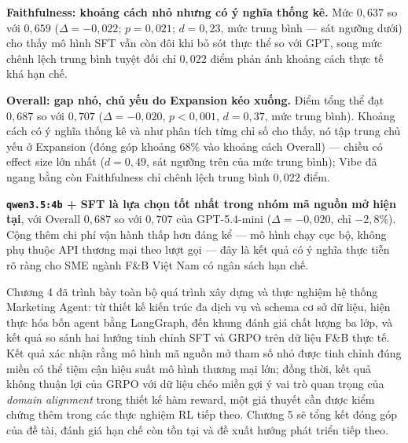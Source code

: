 \textbf{Faithfulness: khoảng cách nhỏ nhưng có ý nghĩa thống kê.}
Mức $0{,}637$ so với $0{,}659$ ($\Delta = -0{,}022$; $p = 0{,}021$;
$d = 0{,}23$, mức trung bình --- sát ngưỡng dưới) cho thấy mô hình
SFT vẫn còn đôi khi bỏ sót thực thể so với GPT, song mức chênh lệch
trung bình tuyệt đối chỉ $0{,}022$ điểm phản ánh khoảng cách thực tế
khá hạn chế.

\textbf{Overall: gap nhỏ, chủ yếu do Expansion kéo xuống.}
Điểm tổng thể đạt $0{,}687$ so với $0{,}707$ ($\Delta = -0{,}020$,
$p < 0{,}001$, $d = 0{,}37$, mức trung bình). Khoảng cách có ý nghĩa
thống kê và như phân tích từng chỉ số cho thấy, nó tập trung chủ yếu
ở Expansion (đóng góp khoảng $68\%$ vào khoảng cách Overall) --- chiều
có effect size lớn nhất ($d = 0{,}49$, sát ngưỡng trên của mức trung
bình); Vibe đã ngang bằng còn Faithfulness chỉ chênh lệch trung bình
$0{,}022$ điểm.

\textbf{\texttt{qwen3.5:4b} + SFT là lựa chọn tốt nhất trong nhóm
mã nguồn mở hiện tại}, với Overall $0{,}687$ so với $0{,}707$ của
GPT-5.4-mini ($\Delta = -0{,}020$, chỉ $-2{,}8\%$). Cộng thêm chi phí
vận hành thấp hơn đáng kể --- mô hình chạy cục bộ, không phụ thuộc API
thương mại theo lượt gọi --- đây là kết quả có ý nghĩa thực tiễn rõ
ràng cho SME ngành F\&B Việt Nam có ngân sách hạn chế.

Chương 4 đã trình bày toàn bộ quá trình xây dựng và thực nghiệm hệ
thống Marketing Agent: từ thiết kế kiến trúc đa dịch vụ và schema cơ
sở dữ liệu, hiện thực hóa bốn agent bằng LangGraph, đến khung đánh
giá chất lượng ba lớp, và kết quả so sánh hai hướng tinh chỉnh SFT và
GRPO trên dữ liệu F\&B thực tế. Kết quả xác nhận rằng mô hình mã
nguồn mở tham số nhỏ được tinh chỉnh đúng miền có thể tiệm cận hiệu
suất mô hình thương mại lớn; đồng thời, kết quả không thuận lợi của
GRPO với dữ liệu chéo miền gợi ý vai trò quan trọng của
\emph{domain alignment} trong thiết kế hàm reward, một giả thuyết cần
được kiểm chứng thêm trong các thực nghiệm RL tiếp theo. Chương 5 sẽ
tổng kết đóng góp của đề tài, đánh giá hạn chế còn tồn tại và đề xuất
hướng phát triển tiếp theo.
